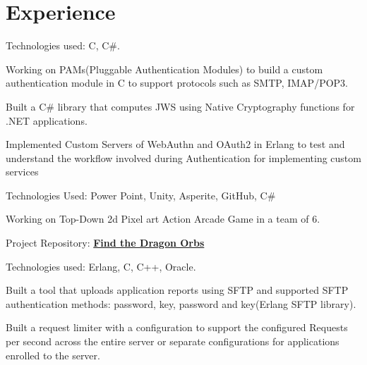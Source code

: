 \documentclass[]{deedy-resume-openfont}
\begin{document}
\begin{minipage}[t]{0.64\textwidth} 


\section{Experience}
\vspace{\topsep} %
\begin{tightemize}\item Technologies used: C, C\#.
\item Working on PAMs(Pluggable Authentication Modules) to build a custom authentication module in C to support protocols such as SMTP, IMAP/POP3.
\item Built a C\# library that computes JWS using Native Cryptography functions for .NET applications.
\item Implemented Custom Servers of WebAuthn and OAuth2 in Erlang to test and understand the workflow involved during Authentication for implementing custom services
\end{tightemize}
\sectionsep

\begin{tightemize}
\item Technologies Used: Power Point, Unity, Asperite, GitHub, C\#
\item Working on Top-Down 2d Pixel art Action Arcade Game in a team of 6.
\item Project Repository: \textbf{\href{https://github.com/tarun-medida/FindTheDragonOrbs}{Find the Dragon Orbs}}
\end{tightemize}
\sectionsep

\begin{tightemize}\item Technologies used: Erlang, C, C++, Oracle.
\item Built a tool that uploads application reports using SFTP and supported SFTP authentication methods: password, key, password and key(Erlang SFTP library).
\item Built a request limiter with a configuration to support the configured Requests per second across the entire server or separate configurations for applications enrolled to the server.
\end{tightemize}
\sectionsep


\end{minipage}
\end{document}

